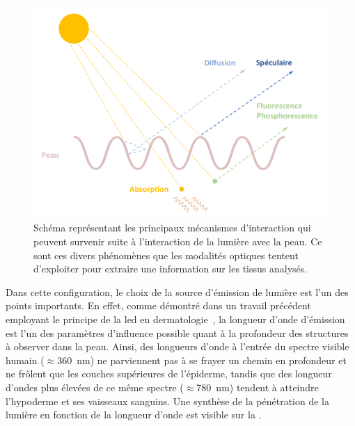 \begin{figure}[H]
    \centering
    \includegraphics[width=\linewidth]{contents/chapter_2/resources/scheme_light_interaction.pdf}
    \caption{Schéma représentant les principaux mécanismes d'interaction qui peuvent survenir suite à l'interaction de la lumière avec la peau. Ce sont ces divers phénomènes que les modalités optiques tentent d'exploiter pour extraire une information sur les tissus analysés.}
    \label{fig:scheme_light_interaction}
\end{figure}\par

Dans cette configuration, le choix de la source d'émission de lumière est l'un des points importants. En effet, comme démontré dans un travail précédent employant le principe de la \gls{led} en dermatologie~\cite{Barolet2008}, la longueur d'onde d'émission est l'un des paramètres d'influence possible quant à la profondeur des structures à observer dans la peau. Ainsi, des longueurs d'onde à l'entrée du spectre visible humain ($\approx$\SI{360}{\nano\metre}) ne parviennent pas à se frayer un chemin en profondeur et ne frôlent que les couches supérieures de l'épiderme, tandis que des longueur d'ondes plus élevées de ce même spectre ($\approx$\SI{780}{\nano\metre}) tendent à atteindre l'hypoderme et ses vaisseaux sanguins. Une synthèse de la pénétration de la lumière en fonction de la longueur d'onde est visible sur la .\par

